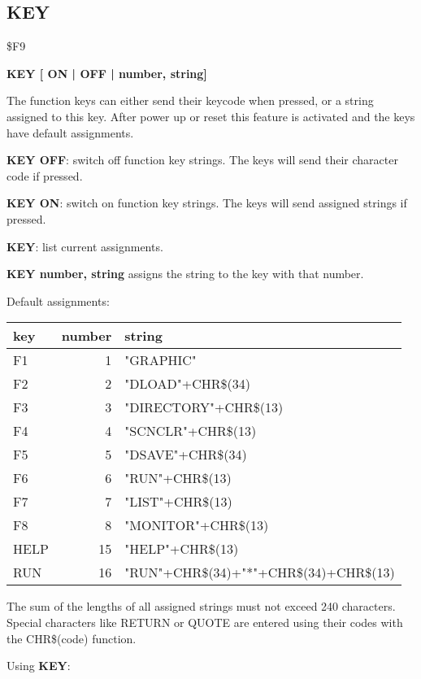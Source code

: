 \subsection{KEY}
\begin{description}[leftmargin=3cm,style=nextline]
\item [Token:] \$F9
\item [Format:] {\bf KEY [ ON | OFF | number, string]}
\item [Usage:] The function keys can either send their keycode
               when pressed, or a string assigned to this key.
               After power up or reset this feature is activated
               and the keys have default assignments.

               {\bf KEY OFF}: switch off function key strings.
               The keys will send their character code if pressed.

               {\bf KEY ON}: switch on function key strings.
               The keys will send assigned strings if pressed.

               {\bf KEY}: list current assignments.

               {\bf KEY number, string} assigns the string to
               the key with that number.

               Default assignments:

\ttfamily
{\setlength{\tabcolsep}{1mm}
\begin{tabular}{|l|r|l|}
\hline
  key  & number & string \\
\hline
F1     &  1 & "GRAPHIC" \\
F2     &  2 & "DLOAD"+CHR\$(34) \\
F3     &  3 & "DIRECTORY"+CHR\$(13) \\
F4     &  4 & "SCNCLR"+CHR\$(13) \\
F5     &  5 & "DSAVE"+CHR\$(34) \\
F6     &  6 & "RUN"+CHR\$(13) \\
F7     &  7 & "LIST"+CHR\$(13) \\
F8     &  8 & "MONITOR"+CHR\$(13) \\
HELP   & 15 & "HELP"+CHR\$(13) \\
RUN    & 16 & "RUN"+CHR\$(34)+"*"+CHR\$(34)+CHR\$(13) \\
\hline
\end{tabular}
}

\item [Remarks:] The sum of the lengths of all assigned strings
                 must not exceed 240 characters.
                 Special characters like RETURN or QUOTE are entered
                 using their codes with the CHR\$(code) function.
\item [Example:] Using {\bf KEY}:
\end{description}

